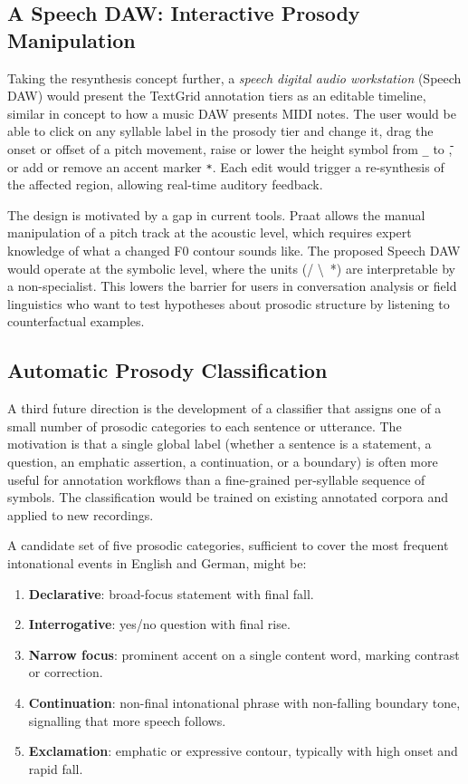 \subsection{A Speech DAW: Interactive Prosody Manipulation}
\label{sec:speech_daw}

Taking the resynthesis concept further, a \emph{speech digital audio workstation}
(Speech DAW) would present the TextGrid annotation tiers as an editable timeline,
similar in concept to how a music DAW presents MIDI notes. The user would be able
to click on any syllable label in the prosody tier and change it, drag the onset
or offset of a pitch movement, raise or lower the height symbol from \texttt{\_}
to \texttt{{\={}}}, or add or remove an accent marker \texttt{*}. Each edit would
trigger a re-synthesis of the affected region, allowing real-time auditory
feedback.

The design is motivated by a gap in current tools. Praat allows the manual
manipulation of a pitch track at the acoustic level, which requires expert
knowledge of what a changed F0 contour sounds like. The proposed Speech DAW
would operate at the symbolic level, where the units (/ \textbackslash\, *) are
interpretable by a non-specialist. This lowers the barrier for users in
conversation analysis or field linguistics who want to test hypotheses about
prosodic structure by listening to counterfactual examples.

\subsection{Automatic Prosody Classification}
\label{sec:prosody_classifier}

A third future direction is the development of a classifier that assigns one of a
small number of prosodic categories to each sentence or utterance. The motivation
is that a single global label (whether a sentence is a statement, a
question, an emphatic assertion, a continuation, or a boundary) is often more
useful for annotation workflows than a fine-grained per-syllable sequence of
symbols. The classification would be trained on existing annotated corpora and
applied to new recordings.

A candidate set of five prosodic categories, sufficient to cover the most
frequent intonational events in English and German, might be:
\begin{enumerate}
\item \textbf{Declarative}: broad-focus statement with final fall.
\item \textbf{Interrogative}: yes/no question with final rise.
\item \textbf{Narrow focus}: prominent accent on a single content word,
      marking contrast or correction.
\item \textbf{Continuation}: non-final intonational phrase with
      non-falling boundary tone, signalling that more speech follows.
\item \textbf{Exclamation}: emphatic or expressive contour, typically with
      high onset and rapid fall.
\end{enumerate}

